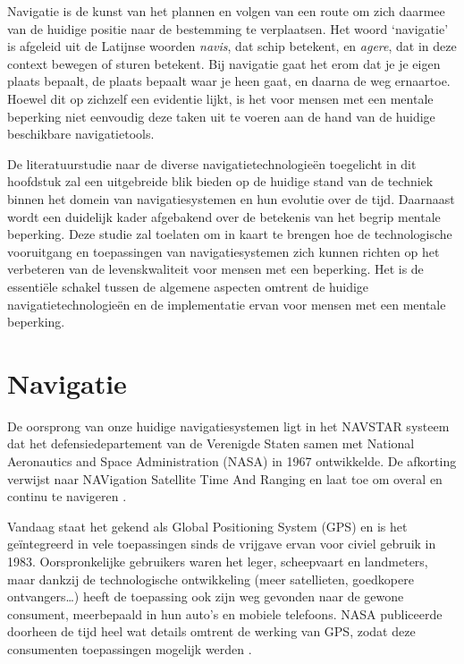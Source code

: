 


Navigatie is de kunst van het plannen en volgen van een route om zich daarmee van de huidige positie naar de bestemming te verplaatsen. Het woord `navigatie' is afgeleid uit de Latijnse woorden \textit{navis}, dat schip betekent, en \textit{agere}, dat in deze context bewegen of sturen betekent. Bij navigatie gaat het erom dat je je eigen plaats bepaalt, de plaats bepaalt waar je heen gaat, en daarna de weg ernaartoe. Hoewel dit op zichzelf een evidentie lijkt, is het voor mensen met een mentale beperking niet eenvoudig deze taken uit te voeren aan de hand van de huidige beschikbare navigatietools.

De literatuurstudie naar de diverse navigatietechnologieën toegelicht in dit hoofdstuk zal een uitgebreide blik bieden op de huidige stand van de techniek binnen het domein van navigatiesystemen en hun evolutie over de tijd. Daarnaast wordt een duidelijk kader afgebakend over de betekenis van het begrip mentale beperking. Deze studie zal toelaten om in kaart te brengen hoe de technologische vooruitgang en toepassingen van navigatiesystemen zich kunnen richten op het verbeteren van de levenskwaliteit voor mensen met een beperking. Het is de essentiële schakel tussen de algemene aspecten omtrent de huidige navigatietechnologieën en de implementatie ervan voor mensen met een mentale beperking.

\section{Navigatie}
\label{sec:navigatie}

De oorsprong van onze huidige navigatiesystemen ligt in het NAVSTAR systeem dat het defensiedepartement van de Verenigde Staten samen met National Aeronautics and Space Administration (NASA) in 1967 ontwikkelde. De afkorting verwijst naar NAVigation Satellite Time And Ranging en laat toe om overal en continu te navigeren \autocite{Bowditch2002}. 

Vandaag staat het gekend als Global Positioning System (GPS) en is het geïntegreerd in vele toepassingen sinds de vrijgave ervan voor civiel gebruik in 1983. Oorspronkelijke gebruikers waren het leger, scheepvaart en landmeters, maar dankzij de technologische ontwikkeling (meer satellieten, goedkopere ontvangers\ldots) heeft de toepassing ook zijn weg gevonden naar de gewone consument, meerbepaald in hun auto's en mobiele telefoons. NASA publiceerde doorheen de tijd heel wat details omtrent de werking van GPS, zodat deze consumenten toepassingen mogelijk werden \autocite{Zaidman2008}. 

